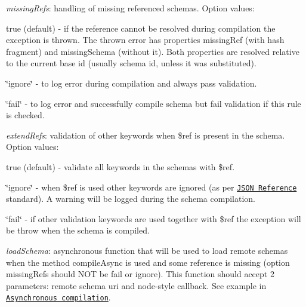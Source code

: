 \begin{DoxyItemize}
\item {\itshape missing\+Refs}\+: handling of missing referenced schemas. Option values\+:
\begin{DoxyItemize}
\item {\ttfamily true} (default) -\/ if the reference cannot be resolved during compilation the exception is thrown. The thrown error has properties {\ttfamily missing\+Ref} (with hash fragment) and {\ttfamily missing\+Schema} (without it). Both properties are resolved relative to the current base id (usually schema id, unless it was substituted).
\item {\ttfamily \char`\"{}ignore\char`\"{}} -\/ to log error during compilation and always pass validation.
\item {\ttfamily \char`\"{}fail\char`\"{}} -\/ to log error and successfully compile schema but fail validation if this rule is checked.
\end{DoxyItemize}
\item {\itshape extend\+Refs}\+: validation of other keywords when {\ttfamily \$ref} is present in the schema. Option values\+:
\begin{DoxyItemize}
\item {\ttfamily true} (default) -\/ validate all keywords in the schemas with {\ttfamily \$ref}.
\item {\ttfamily \char`\"{}ignore\char`\"{}} -\/ when {\ttfamily \$ref} is used other keywords are ignored (as per \href{https://tools.ietf.org/html/draft-pbryan-zyp-json-ref-03#section-3}{\tt J\+S\+ON Reference} standard). A warning will be logged during the schema compilation.
\item {\ttfamily \char`\"{}fail\char`\"{}} -\/ if other validation keywords are used together with {\ttfamily \$ref} the exception will be throw when the schema is compiled.
\end{DoxyItemize}
\item {\itshape load\+Schema}\+: asynchronous function that will be used to load remote schemas when the method {\ttfamily compile\+Async} is used and some reference is missing (option {\ttfamily missing\+Refs} should N\+OT be \textquotesingle{}fail\textquotesingle{} or \textquotesingle{}ignore\textquotesingle{}). This function should accept 2 parameters\+: remote schema uri and node-\/style callback. See example in \href{#asynchronous-compilation}{\tt Asynchronous compilation}.
\end{DoxyItemize}

